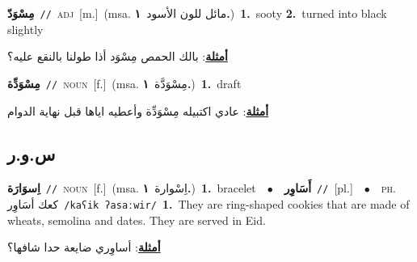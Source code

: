 \documentclass[10pt,a4paper,twoside]{article} %
\begin{document}
\begin{multicols}{2}
{\setlength\topsep{0pt}\textbf{\foreignlanguage{arabic}{مِسْوَدّ}}\ {\color{gray}\texttt{//}\color{black}}\ \textsc{adj}\ [m.]\ \color{gray}(msa. \foreignlanguage{arabic}{مائل للون الأسود}~\foreignlanguage{arabic}{\textbf{١.}})\color{black}\ \textbf{1.}~sooty  \textbf{2.}~turned into black slightly\  \begin{flushright}\color{gray}\foreignlanguage{arabic}{\textbf{\underline{\foreignlanguage{arabic}{أمثلة}}}: بالك الحمص مِسْوَد أذا طولنا بالنقع عليه؟}\end{flushright}\color{black}} \vspace{2mm}

{\setlength\topsep{0pt}\textbf{\foreignlanguage{arabic}{مِسْوَدِّة}}\ {\color{gray}\texttt{//}\color{black}}\ \textsc{noun}\ [f.]\ \color{gray}(msa. \foreignlanguage{arabic}{مِسْوَدَّة}~\foreignlanguage{arabic}{\textbf{١.}})\color{black}\ \textbf{1.}~draft\  \begin{flushright}\color{gray}\foreignlanguage{arabic}{\textbf{\underline{\foreignlanguage{arabic}{أمثلة}}}: عادي اكتبيله مِسْوَدِّة وأعطيه اياها قبل نهاية الدوام}\end{flushright}\color{black}} \vspace{2mm}

\vspace{-3mm}
\subsection*{\color{blue}\foreignlanguage{arabic}{س.و.ر}\color{blue}{}} 

{\setlength\topsep{0pt}\textbf{\foreignlanguage{arabic}{اِسوَارَة}}\ {\color{gray}\texttt{//}\color{black}}\ \textsc{noun}\ [f.]\ \color{gray}(msa. \foreignlanguage{arabic}{اِسْوارة}~\foreignlanguage{arabic}{\textbf{١.}})\color{black}\ \textbf{1.}~bracelet\ \ $\bullet$\ \ \setlength\topsep{0pt}\textbf{\foreignlanguage{arabic}{أَسَاوِر}}\ {\color{gray}\texttt{//}\color{black}}\ [pl.]\ \ $\bullet$\ \ \textsc{ph.} \color{gray} \foreignlanguage{arabic}{كعك أسَاوِر}\color{black}\ {\color{gray}\texttt{/{\sffamily kaʕik ʔasaːwir}/}\color{black}}\ \textbf{1.}~They are ring-shaped cookies that are made of wheats, semolina and dates. They are served in Eid.\  \begin{flushright}\color{gray}\foreignlanguage{arabic}{\textbf{\underline{\foreignlanguage{arabic}{أمثلة}}}: أساوِري ضايعة حدا شافها؟}\end{flushright}\color{black}} \vspace{2mm}


\end{multicols}
\end{document}
